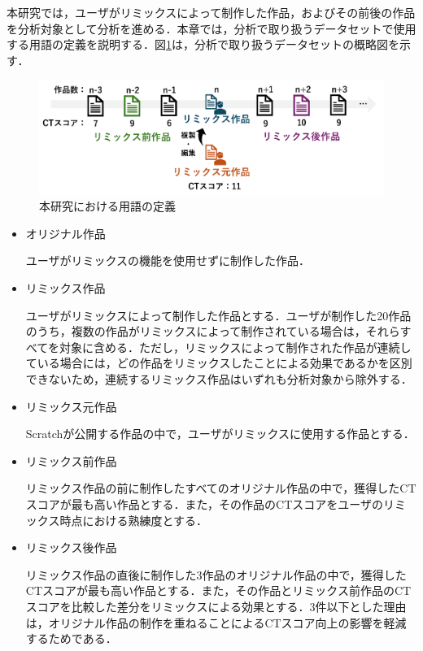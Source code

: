 \documentclass[submit,techrep,noauthor]{ipsj}
\begin{document}
本研究では，ユーザがリミックスによって制作した作品，およびその前後の作品を分析対象として分析を進める．本章では，分析で取り扱うデータセットで使用する用語の定義を説明する．図\ref{teigi}は，分析で取り扱うデータセットの概略図を示す．

\begin{figure}[t]
  \centering
  \includegraphics[width=0.7\linewidth]{@IPSJ_SIGSE202511_Horio/fig/teigi.pdf}
  \caption{本研究における用語の定義}
  \label{teigi}
\end{figure}

\begin{itemize}
    \item オリジナル作品
  
    ユーザがリミックスの機能を使用せずに制作した作品．

    \item リミックス作品

    ユーザがリミックスによって制作した作品とする．ユーザが制作した20作品のうち，複数の作品がリミックスによって制作されている場合は，それらすべてを対象に含める．ただし，リミックスによって制作された作品が連続している場合には，どの作品をリミックスしたことによる効果であるかを区別できないため，連続するリミックス作品はいずれも分析対象から除外する．
     
    \item リミックス元作品

    Scratchが公開する作品の中で，ユーザがリミックスに使用する作品とする．
    
    \item リミックス前作品
  
    リミックス作品の前に制作したすべてのオリジナル作品の中で，獲得したCTスコアが最も高い作品とする．また，その作品のCTスコアをユーザのリミックス時点における熟練度とする．

    \item リミックス後作品
  
    リミックス作品の直後に制作した3作品のオリジナル作品の中で，獲得したCTスコアが最も高い作品とする．また，その作品とリミックス前作品のCTスコアを比較した差分をリミックスによる効果とする．3件以下とした理由は，オリジナル作品の制作を重ねることによるCTスコア向上の影響を軽減するためである．
\end{itemize}
\end{document}
